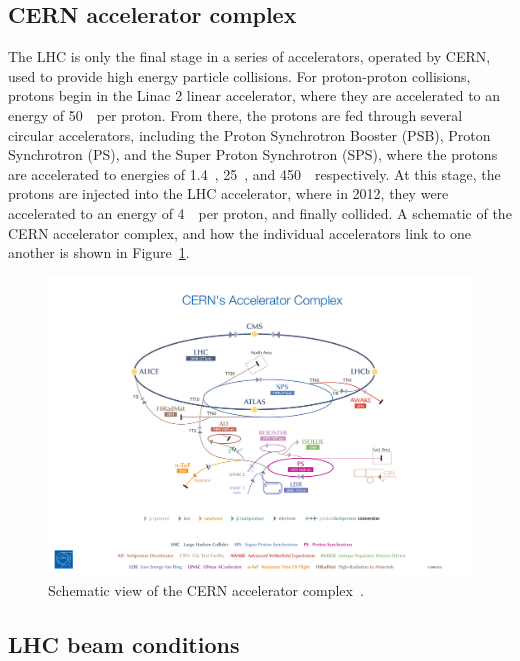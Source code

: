 \subsection{CERN accelerator complex}
\label{sec:accelerator_complex}

The LHC is only the final stage in a series of accelerators, operated by CERN,
used to provide high energy particle collisions.
For proton-proton collisions, protons begin in the Linac 2 linear
accelerator, where they are accelerated to an energy of 50~\MeV\ per proton.
From there, the protons are fed through several circular accelerators, including
the Proton Synchrotron Booster (PSB), Proton Synchrotron (PS), and the Super
Proton Synchrotron (SPS), where the protons are accelerated to energies of
1.4~\GeV, 25~\GeV, and 450~\GeV\ respectively.
At this stage, the protons are injected into the LHC accelerator, where 
in 2012, they were accelerated to an energy of 4~\TeV\ per proton, and finally
collided.
A schematic of the CERN accelerator complex, and how the individual
accelerators link to one another is shown in Figure~\ref{fig:cern_complex}.

\begin{figure}[th]
  \centering
  \includegraphics[width=\textwidth, clip=true, trim=15cm 0 15cm 10cm]
    {figs/lhc/accelerator_complex.jpg}
  \caption{
    Schematic view of the CERN accelerator complex~\cite{Marcastel:1621583}.
  }
  \label{fig:cern_complex}
\end{figure}

\FloatBarrier
\subsection{LHC beam conditions}
\label{sec:beam_conditions}

